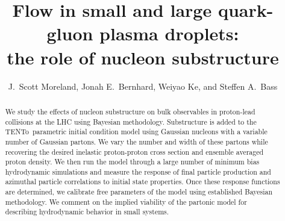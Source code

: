 \documentclass[3p,times,procedia]{elsarticle}
\newcommand{\trento}{T\raisebox{-0.3ex}{R}ENTo}
\begin{document}
\begin{frontmatter}




\title{Flow in small and large quark-gluon plasma droplets:\\the role of nucleon substructure}

\author{J.\ Scott Moreland, Jonah E.\ Bernhard, Weiyao Ke, and Steffen A.\ Bass}
\address{Department of Physics, Duke University, Durham, NC 27708-0305}

\begin{abstract}
We study the effects of nucleon substructure on bulk observables in proton-lead collisions at the LHC using Bayesian methodology. Substructure is added to the \trento\ parametric initial condition model using Gaussian nucleons with a variable number of Gaussian partons. We vary the number and width of these partons while recovering the desired inelastic proton-proton cross section and ensemble averaged proton density. We then run the model through a large number of minimum bias hydrodynamic simulations and measure the response of final particle production and azimuthal particle correlations to initial state properties. Once these response functions are determined, we calibrate free parameters of the model using established Bayesian methodology. We comment on the implied viability of the partonic model for describing hydrodynamic behavior in small systems.
\end{abstract}


\end{frontmatter}
\end{document}
